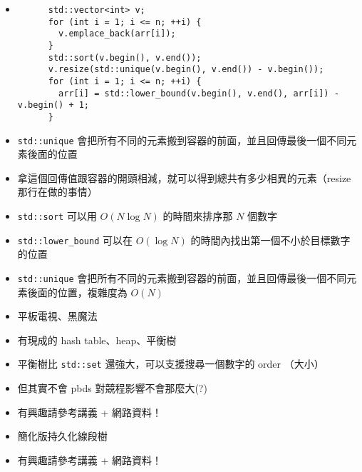 \documentclass[standalone]{beamer}
\begin{document}
\begin{frame}[fragile]{}
  \begin{itemize}
    \item 
    \begin{verbatim}
      std::vector<int> v;
      for (int i = 1; i <= n; ++i) {
        v.emplace_back(arr[i]);
      }
      std::sort(v.begin(), v.end());
      v.resize(std::unique(v.begin(), v.end()) - v.begin());
      for (int i = 1; i <= n; ++i) {
        arr[i] = std::lower_bound(v.begin(), v.end(), arr[i]) - v.begin() + 1;
      }
    \end{verbatim}

    \item \texttt{std::unique} 會把所有不同的元素搬到容器的前面，並且回傳最後一個不同元素後面的位置
    \item 拿這個回傳值跟容器的開頭相減，就可以得到總共有多少相異的元素（resize 那行在做的事情）
  \end{itemize}
\end{frame}

\begin{frame}{}
  \begin{itemize}
    \item \texttt{std::sort} 可以用 $O(N \log N)$ 的時間來排序那 $N$ 個數字
    \item \texttt{std::lower\_bound} 可以在 $O(\log N)$ 的時間內找出第一個不小於目標數字的位置
    \item \texttt{std::unique} 會把所有不同的元素搬到容器的前面，並且回傳最後一個不同元素後面的位置，複雜度為 $O(N)$
  \end{itemize}
\end{frame}

\begin{frame}{}
  \begin{itemize}
    \item 平板電視、黑魔法
    \item 有現成的 hash table、heap、平衡樹
    \item 平衡樹比 \texttt{std::set} 還強大，可以支援搜尋一個數字的 order （大小）
    \item 但其實不會 pbds 對競程影響不會那麼大(?)
    \item 有興趣請參考講義 + 網路資料！
  \end{itemize}
\end{frame}

\begin{frame}{}
  \begin{itemize}
    \item 簡化版持久化線段樹
    \item 有興趣請參考講義 + 網路資料！
  \end{itemize}
\end{frame}
\end{document}
